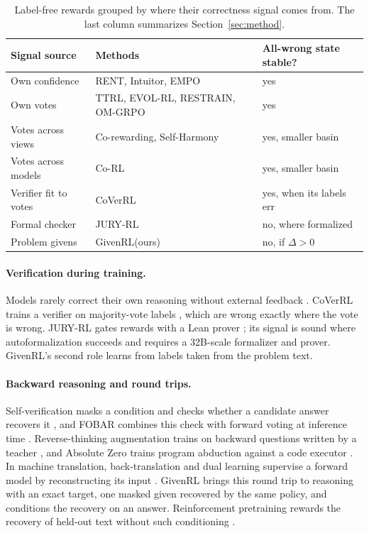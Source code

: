 \documentclass[11pt]{article}
\theoremstyle{remark}
\newcommand{\method}{GivenRL\xspace}
\begin{document}
\begin{table}[t]
  \centering
  \small
  \setlength{\tabcolsep}{4pt}
  \begin{tabular}{@{}>{\raggedright\arraybackslash}p{2.05cm}>{\raggedright\arraybackslash}p{2.95cm}>{\raggedright\arraybackslash}p{1.85cm}@{}}
    \toprule
    Signal source & Methods & All-wrong state stable? \\
    \midrule
    Own confidence & RENT, Intuitor, EMPO & yes \\
    Own votes & TTRL, EVOL-RL, RESTRAIN, OM-GRPO & yes \\
    Votes across views & Co-rewarding, Self-Harmony & yes, smaller basin \\
    Votes across models & Co-RL & yes, smaller basin \\
    Verifier fit to votes & CoVerRL & yes, when its labels err \\
    \midrule
    Formal checker & JURY-RL & no, where formalized \\
    \rowcolor{rowours}Problem givens & \method (ours) & no, if $\Delta>0$ \\
    \bottomrule
  \end{tabular}
  \caption{Label-free rewards grouped by where their correctness signal comes from. The last column summarizes Section~\ref{sec:method}.}
  \label{tab:taxonomy}
\end{table}

\paragraph{Verification during training.}
Models rarely correct their own reasoning without external feedback \citep{huang2024cannot}. CoVerRL trains a verifier on majority-vote labels \citep{pan2026coverrl}, which are wrong exactly where the vote is wrong. JURY-RL gates rewards with a Lean prover \citep{chen2026juryrl}; its signal is sound where autoformalization succeeds and requires a 32B-scale formalizer and prover. \method's second role learns from labels taken from the problem text.

\paragraph{Backward reasoning and round trips.}
Self-verification masks a condition and checks whether a candidate answer recovers it \citep{weng2023selfverification}, and FOBAR combines this check with forward voting at inference time \citep{jiang2024fobar}. Reverse-thinking augmentation trains on backward questions written by a teacher \citep{chen2025reverse}, and Absolute Zero trains program abduction against a code executor \citep{zhao2025absolutezero}. In machine translation, back-translation and dual learning supervise a forward model by reconstructing its input \citep{sennrich2016backtranslation,he2016dual}. \method brings this round trip to reasoning with an exact target, one masked given recovered by the same policy, and conditions the recovery on an answer. Reinforcement pretraining rewards the recovery of held-out text without such conditioning \citep{dong2025rpt,xing2026pretrainzero}.
\end{document}
